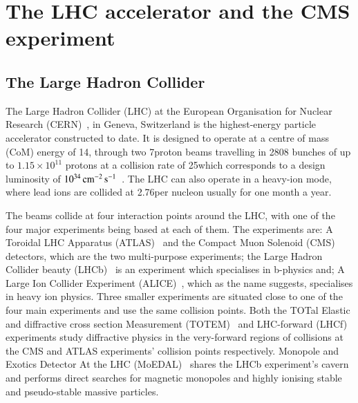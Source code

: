 \section{The LHC accelerator and the CMS experiment}\label{sec:lhc-cms}
\subsection{The Large Hadron Collider}\label{subsec:lhc}

The Large Hadron Collider (LHC) at the European Organisation for Nuclear Research (CERN)~\cite{Bruning:782076}, in Geneva, Switzerland is the highest-energy particle accelerator constructed to date. 
It is designed to operate at a centre of mass (CoM) energy of 14\TeV, through two 7\TeV proton beams travelling in 2808 bunches of up to $1.15 \times 10^{11}$ protons at a collision rate of 25\nsm which corresponds to a design luminosity of $10^{34}\,\text{cm}^\text{$-$2}\,\text{s}^\text{$-$1}$~\cite{Bayatian:2006zz}. 
The LHC can also operate in a heavy-ion mode, where lead ions are collided at 2.76\TeV per nucleon usually for one month a year.

The beams collide at four interaction points around the LHC, with one of the four major experiments being based at each of them. 
The experiments are: A Toroidal LHC Apparatus (ATLAS)~\cite{Aad:2008zzm} and the Compact Muon Solenoid (CMS)~\cite{oldcms} detectors, which are the two multi-purpose experiments; the Large Hadron Collider beauty (LHCb)~\cite{Alves:2008zz} is an experiment which specialises in b-physics and; A Large Ion Collider Experiment (ALICE)~\cite{Aamodt:2008zz}, which as the name suggests, specialises in heavy ion physics.
Three smaller experiments are situated close to one of the four main experiments and use the same collision points.
Both the TOTal Elastic and diffractive cross section Measurement (TOTEM)~\cite{Anelli:2008zza} and LHC-forward (LHCf)~\cite{Adriani:2008zz} experiments study diffractive physics in the very-forward regions of collisions at the CMS and ATLAS experiments' collision points respectively.
Monopole and Exotics Detector At the LHC (MoEDAL)~\cite{Pinfold:2009oia} shares the LHCb experiment's cavern and performs direct searches for magnetic monopoles and highly ionising stable and pseudo-stable massive particles.

